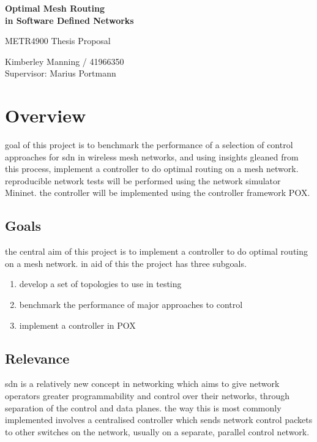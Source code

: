 \documentclass[pdftex,12pt,a4paper]{article}
\begin{document}
\thispagestyle{empty}
\begin{center}
	\vspace*{35mm}
	{\huge\bf
		Optimal Mesh Routing \\
		in Software Defined Networks \\
	}

	\vspace{20mm}
	{\Large 
		METR4900 Thesis Proposal \\
	}

	\vspace{20mm}
	Kimberley Manning / 41966350 \\
	Supervisor: Marius Portmann
\end{center}

\newpage
\thispagestyle{empty}
\tableofcontents
\listoftables

\newpage
{}
\section{Overview}
goal of this project is to benchmark the performance of a selection of control approaches for sdn in wireless mesh networks, and using insights gleaned from this process, implement a controller to do optimal routing on a mesh network. reproducible network tests will be performed using the network simulator Mininet. the controller will be implemented using the controller framework POX.

\subsection{Goals}

the central aim of this project is to implement a controller to do optimal routing on a mesh network. in aid of this the project has three subgoals.

\begin{enumerate}
	\item develop a set of topologies to use in testing
	\item benchmark the performance of major approaches to control
	\item implement a controller in POX
\end{enumerate}

\subsection{Relevance}

sdn is a relatively new concept in networking which aims to give network operators greater programmability and control over their networks, through separation of the control and data planes. the way this is most commonly implemented involves a centralised controller which sends network control packets to other switches on the network, usually on a separate, parallel control network. 
\end{document}
